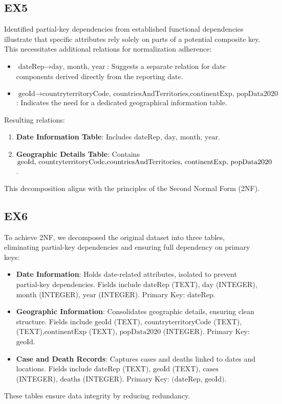 \documentclass{article}
\begin{document}
\subsection{EX5}
Identified partial-key dependencies from established functional dependencies illustrate that specific attributes rely solely on parts of a potential composite key. This necessitates additional relations for normalization adherence:
\begin{itemize}
    \item \( \text{dateRep} \rightarrow \text{day, month, year} \): Suggests a separate relation for date components derived directly from the reporting date.
    \item \( \text{geoId} \rightarrow \text{countryterritoryCode, countriesAndTerritories,continentExp, popData2020} \): Indicates the need for a dedicated geographical information table.
\end{itemize}
Resulting relations:
\begin{enumerate}
    \item \textbf{Date Information Table}: Includes \( \text{dateRep, day, month, year} \).
   \item \textbf{Geographic Details Table}: Contains \( \text{geoId, countryterritoryCode,} \\
\text{countriesAndTerritories, continentExp, popData2020} \).

\end{enumerate}
This decomposition aligns with the principles of the Second Normal Form (2NF).

\subsection{EX6}
To achieve 2NF, we decomposed the original dataset into three tables, eliminating partial-key dependencies and ensuring full dependency on primary keys:
\begin{itemize}
    \item \textbf{Date Information}: Holds date-related attributes, isolated to prevent partial-key dependencies. Fields include \( \text{dateRep} \) (TEXT), \( \text{day} \) (INTEGER), \( \text{month} \) (INTEGER), \( \text{year} \) (INTEGER). Primary Key: \( \text{dateRep} \).
    \item \textbf{Geographic Information}: Consolidates geographic details, ensuring clean structure. Fields include \( \text{geoId} \) (TEXT), \( \text{countryterritoryCode} \) (TEXT),  \) (TEXT),\( \text{continentExp} \) (TEXT), \( \text{popData2020} \) (INTEGER). Primary Key: \( \text{geoId} \).
    \item \textbf{Case and Death Records}: Captures cases and deaths linked to dates and locations. Fields include \( \text{dateRep} \) (TEXT), \( \text{geoId} \) (TEXT), \( \text{cases} \) (INTEGER), \( \text{deaths} \) (INTEGER). Primary Key: \( \text{(dateRep, geoId)} \).
\end{itemize}
These tables ensure data integrity by reducing redundancy.
\end{document}
